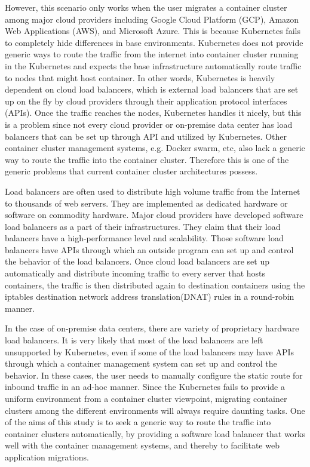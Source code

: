 However, this scenario only works when the user migrates a container cluster among major cloud providers including Google Cloud Platform (GCP), Amazon Web Applications (AWS), and Microsoft Azure.
This is because Kubernetes fails to completely hide differences in base environments.
Kubernetes does not provide generic ways to route the traffic from the internet into container cluster running in the Kubernetes and expects the base infrastructure automatically route traffic to nodes that might host container.
In other words, Kubernetes is heavily dependent on cloud load balancers, which is external load balancers that are set up on the fly by cloud providers through their application protocol interfaces (APIs).
Once the traffic reaches the nodes, Kubernetes handles it nicely, but this is a problem since not every cloud provider or on-premise data center has load balancers that can be set up through API and utilized by Kubernetes.
Other container cluster management systems, e.g. Docker swarm, etc, also lack a generic way to route the traffic into the container cluster.
Therefore this is one of the generic problems that current container cluster architectures possess.

Load balancers are often used to distribute high volume traffic from the Internet to thousands of web servers.
They are implemented as dedicated hardware or software on commodity hardware.
Major cloud providers have developed software load balancers\cite{eisenbud2016maglev,patel2013ananta} as a part of their infrastructures.
They claim that their load balancers have a high-performance level and scalability.
Those software load balancers have APIs through which an outside program can set up and control the behavior of the load balancers.
Once cloud load balancers are set up automatically and distribute incoming traffic to every server that hosts containers,
the traffic is then distributed again to destination containers using the iptables destination network address translation(DNAT)\cite{MartinA.Brown2017,Marmol2015} rules in a round-robin manner.

In the case of on-premise data centers, there are variety of proprietary hardware load balancers.
It is very likely that most of the load balancers are left unsupported by Kubernetes, even if some of the load balancers may have APIs through which a container management system can set up and control the behavior.
In these cases, the user needs to manually configure the static route for inbound traffic in an ad-hoc manner.
Since the Kubernetes fails to provide a uniform environment from a container cluster viewpoint, migrating container clusters among the different environments will always require daunting tasks.
One of the aims of this study is to seek a generic way to route the traffic into container clusters automatically, by providing a software load balancer that works well with the container management systems, and thereby to facilitate web application migrations.

